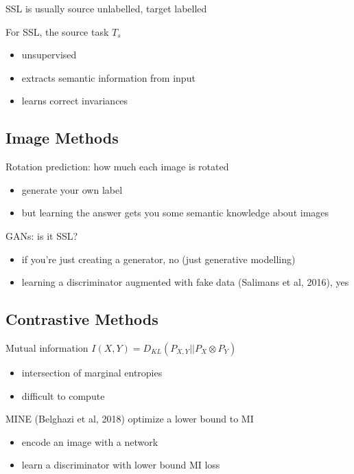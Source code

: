 \documentclass[]{article}
\theoremstyle{definition}
\begin{document}
    SSL is usually source unlabelled, target labelled

    For SSL, the source task $T_s$
    \begin{itemize}
        \item unsupervised
        \item extracts semantic information from input
        \item learns correct invariances
    \end{itemize}

    \subsection{Image Methods}%
    \label{sub:questions}

    Rotation prediction: how much each image is rotated
    \begin{itemize}
        \item generate your own label
        \item but learning the answer gets you some semantic knowledge about images
    \end{itemize}


    GANs: is it SSL?
    \begin{itemize}
        \item if you're just creating a generator, no (just generative modelling)
        \item learning a discriminator augmented with fake data (Salimans et al, 2016), yes
    \end{itemize}

    \subsection{Contrastive Methods}%
    \label{sub:contrastive_methods}

    Mutual information $I(X,Y) = D_{KL}(P_{X,Y} || P_X \otimes P_Y)$
    \begin{itemize}
        \item intersection of marginal entropies
        \item difficult to compute
    \end{itemize}

    MINE (Belghazi et al, 2018) optimize a lower bound to MI
    \begin{itemize}
        \item encode an image with a network
        \item learn a discriminator with lower bound MI loss
    \end{itemize}
\end{document}
